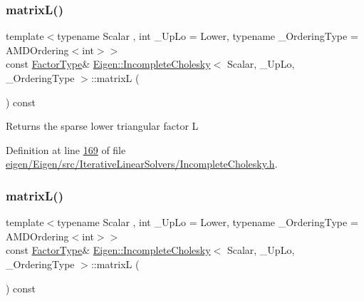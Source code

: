 \subsubsection{\texorpdfstring{matrix\+L()}{matrixL()}\hspace{0.1cm}{\footnotesize\ttfamily [1/2]}}
{\footnotesize\ttfamily template$<$typename Scalar , int \+\_\+\+Up\+Lo = Lower, typename \+\_\+\+Ordering\+Type  = A\+M\+D\+Ordering$<$int$>$$>$ \\
const \hyperlink{group___sparse_core___module}{Factor\+Type}\& \hyperlink{class_eigen_1_1_incomplete_cholesky}{Eigen\+::\+Incomplete\+Cholesky}$<$ Scalar, \+\_\+\+Up\+Lo, \+\_\+\+Ordering\+Type $>$\+::matrixL (\begin{DoxyParamCaption}{ }\end{DoxyParamCaption}) const\hspace{0.3cm}{\ttfamily [inline]}}

\begin{DoxyReturn}{Returns}
the sparse lower triangular factor L 
\end{DoxyReturn}


Definition at line \hyperlink{eigen_2_eigen_2src_2_iterative_linear_solvers_2_incomplete_cholesky_8h_source_l00169}{169} of file \hyperlink{eigen_2_eigen_2src_2_iterative_linear_solvers_2_incomplete_cholesky_8h_source}{eigen/\+Eigen/src/\+Iterative\+Linear\+Solvers/\+Incomplete\+Cholesky.\+h}.

\mbox{\label{class_eigen_1_1_incomplete_cholesky_a7d1f1878505fd1862e6f2286d27ff09a}} 
\subsubsection{\texorpdfstring{matrix\+L()}{matrixL()}\hspace{0.1cm}{\footnotesize\ttfamily [2/2]}}
{\footnotesize\ttfamily template$<$typename Scalar , int \+\_\+\+Up\+Lo = Lower, typename \+\_\+\+Ordering\+Type  = A\+M\+D\+Ordering$<$int$>$$>$ \\
const \hyperlink{group___sparse_core___module}{Factor\+Type}\& \hyperlink{class_eigen_1_1_incomplete_cholesky}{Eigen\+::\+Incomplete\+Cholesky}$<$ Scalar, \+\_\+\+Up\+Lo, \+\_\+\+Ordering\+Type $>$\+::matrixL (\begin{DoxyParamCaption}{ }\end{DoxyParamCaption}) const\hspace{0.3cm}{\ttfamily [inline]}}

